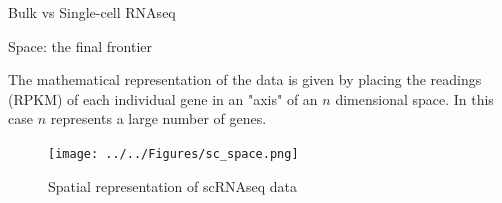 \documentclass{beamer}
\begin{document}
\begin{frame}{Bulk vs Single-cell RNAseq}
	
\begin{figure}%
	\centering
	\qquad
\end{figure}
	
\end{frame}

	
	\begin{frame}{Space: the final frontier}
		
The mathematical representation of the data is given by placing the readings (RPKM) of each individual gene in an "axis" of an $n$ dimensional space.
 In this case $n$ represents a large number of genes.
 
\begin{figure}[h]
	\centering
	\texttt{[image: ../../Figures/sc\_space.png]}
	\caption{Spatial representation of scRNAseq data}
\end{figure}
		
	\end{frame}
	
\end{document}
